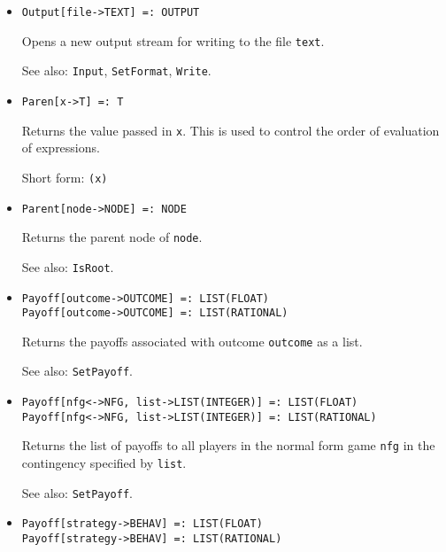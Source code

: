 \begin{itemize}
\item
\protect \large \begin{verbatim}
Output[file->TEXT] =: OUTPUT
\end{verbatim}\normalsize

\bd
Opens a new output stream for writing to the file \verb+text+.
\item
[See also:]  {\tt Input}, {\tt SetFormat}, {\tt Write}.
\ed


\item
\protect \large \begin{verbatim}
Paren[x->T] =: T
\end{verbatim}\normalsize

\bd
Returns the value passed in \verb+x+.  This is used to control
the order of evaluation of expressions.
\item
[Short form:] \verb+(x)+
\ed

\item
\protect \large \begin{verbatim}
Parent[node->NODE] =: NODE
\end{verbatim}\normalsize

\bd
Returns the parent node of \verb+node+.
\item
[See also:] {\tt IsRoot}.
\ed

\item
\protect \large \begin{verbatim}
Payoff[outcome->OUTCOME] =: LIST(FLOAT)
Payoff[outcome->OUTCOME] =: LIST(RATIONAL)
\end{verbatim}\normalsize

\bd
Returns the payoffs associated with outcome \verb+outcome+
as a list.
\item
[See also:] {\tt SetPayoff}.
\ed

\item
\protect \large \begin{verbatim}
Payoff[nfg<->NFG, list->LIST(INTEGER)] =: LIST(FLOAT)
Payoff[nfg<->NFG, list->LIST(INTEGER)] =: LIST(RATIONAL)
\end{verbatim}\normalsize

\bd
Returns the list of payoffs to all players in the normal form game
\verb+nfg+ in the contingency specified by \verb+list+.
\item
[See also:] {\tt SetPayoff}.
\ed

\item
\protect \large \begin{verbatim}
Payoff[strategy->BEHAV] =: LIST(FLOAT)
Payoff[strategy->BEHAV] =: LIST(RATIONAL)
\end{verbatim}\normalsize


\end{itemize}
